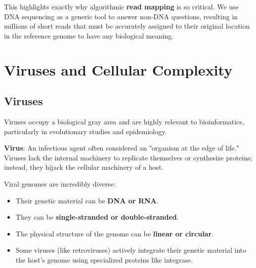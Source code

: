 \sta This highlights exactly why algorithmic \textbf{read mapping} is so critical. We use DNA sequencing as a generic tool to answer non-DNA questions, resulting in millions of short reads that must be accurately assigned to their original location in the reference genome to have any biological meaning.

\section{Viruses and Cellular Complexity}

\subsection{Viruses}
Viruses occupy a biological gray area and are highly relevant to bioinformatics, particularly in evolutionary studies and epidemiology.

\begin{important}
  \textbf{Virus}: An infectious agent often considered an "organism at the edge of life." Viruses lack the internal machinery to replicate themselves or synthesize proteins; instead, they hijack the cellular machinery of a host.
\end{important}

Viral genomes are incredibly diverse:
\begin{itemize}
    \item Their genetic material can be \textbf{DNA or RNA}.
    \item They can be \textbf{single-stranded or double-stranded}.
    \item The physical structure of the genome can be \textbf{linear or circular}.
    \item Some viruses (like retroviruses) actively integrate their genetic material into the host's genome using specialized proteins like integrase.
\end{itemize}


